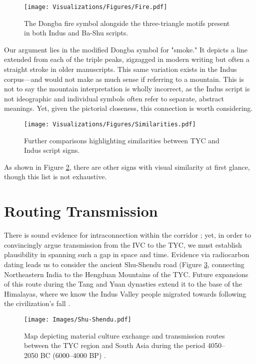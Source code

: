 \documentclass[11pt,a4paper,oneside]{report}
\begin{document}
\begin{figure}[H] 
    \centering
    \texttt{[image: Visualizations/Figures/Fire.pdf]}
    \caption[Indus vs. Dongba Fire \& Smoke Comparison Chart]{The Dongba fire symbol alongside the three-triangle motifs present in both Indus and Ba-Shu scripts.}
    \label{fig:fire}
\end{figure}

Our argument lies in the modified Dongba symbol for "smoke." It depicts a line extended from each of the triple peaks, zigzagged in modern writing but often a straight stroke in older manuscripts. This same variation exists in the Indus corpus—and would not make as much sense if referring to a mountain. This is not to say the mountain interpretation is wholly incorrect, as the Indus script is not ideographic and individual symbols often refer to separate, abstract meanings. Yet, given the pictorial closeness, this connection is worth considering.

\begin{figure}[H] 
    \centering
    \texttt{[image: Visualizations/Figures/Similarities.pdf]}
    \caption[Additional IVC-TYC Sign Comparison Chart]{Further comparisons highlighting similarities between TYC and Indus script signs.}
    \label{fig:sim}
\end{figure}

As shown in Figure \ref{fig:sim}, there are other signs with visual similarity at first glance, though this list is not exhaustive.


\section{Routing Transmission}
\noindent\hspace{1cm}
There is sound evidence for intraconnection within the corridor \cite{yao_genetic_2017, shi_ethnic_2018}; yet, in order to convincingly argue transmission from the IVC to the TYC, we must establish plausibility in spanning such a gap in space and time. Evidence via radiocarbon dating leads us to consider the ancient Shu-Shendu road (Figure \ref{fig:shu-shendu}, connecting Northeastern India to the Hengduan Mountains of the TYC. Future expansions of this route during the Tang and Yuan dynasties extend it to the base of the Himalayas, where we know the Indus Valley people migrated towards following the civilization's fall \cite{khan_bricks_2013, law_building_2007}.  

\begin{figure}[H] 
    \centering
    \texttt{[image: Images/Shu-Shendu.pdf]}
    \caption[Shu-Shendu Road Contextual Map]{Map depicting material culture exchange and transmission routes between the TYC region and South Asia during the period 4050–2050 BC (6000–4000 BP) \cite{ma_understanding_2023}.}
    \label{fig:shu-shendu}
\end{figure}
\end{document}
